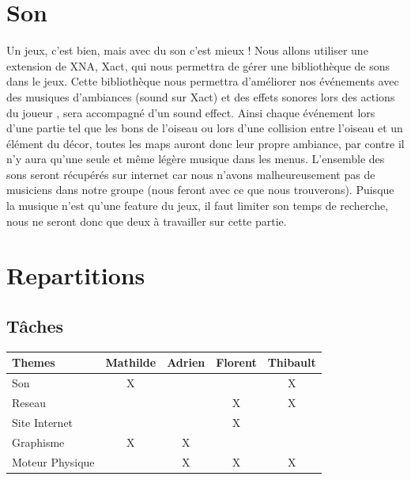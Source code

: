 \documentclass [11pt]{report}
\begin{document}
	\section {Son}
		Un jeux, c'est bien, mais avec du son c'est mieux ! Nous allons utiliser une extension de XNA, Xact, qui nous permettra de g\'erer une biblioth\`eque de sons dans le jeux. Cette biblioth\`eque nous permettra d'am\'eliorer nos \'ev\'enements avec des musiques d'ambiances (sound sur Xact) et des effets sonores lors des actions du 		joueur , sera accompagné d'un sound effect. Ainsi chaque événement lors d'une partie tel que les bons de l'oiseau ou lors d'une collision entre l'oiseau et un élément du décor, toutes les maps auront donc leur propre ambiance, par contre il n'y aura qu'une seule et même légère musique dans les menus. L'ensemble des sons seront récupérés sur internet car nous n'avons malheureusement pas de musiciens dans notre groupe (nous feront avec ce que nous trouverons). Puisque la musique n'est qu'une feature du jeux, il faut limiter son temps de recherche, nous ne seront donc que deux à travailler sur cette partie.

	\section{Repartitions}
		\subsection{Tâches}
			\begin{tabular}{| l |*{4} {c|}}
				\hline
				Themes & Mathilde & Adrien & Florent & Thibault \\
				\hline
				Son & X & & & X \\
				\hline
				Reseau & & & X & X \\
				\hline
				Site Internet & & & X & \\
				\hline
				Graphisme & X & X & & \\
				\hline
				Moteur Physique & & X & X & X\\
				\hline
			\end{tabular}\\\vspace{3mm}
\end{document}
